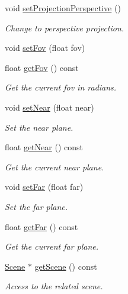 \begin{DoxyCompactItemize}
void \mbox{\hyperlink{classec_1_1_camera_af3544fbe030aadcd6bdfef8cb94e7b5c}{set\+Projection\+Perspective}} ()
\begin{DoxyCompactList}\small\item\em Change to perspective projection. \end{DoxyCompactList}\item 
void \mbox{\hyperlink{classec_1_1_camera_a1003feebe7df69a508f684c1c67f1388}{set\+Fov}} (float fov)
\item 
float \mbox{\hyperlink{classec_1_1_camera_a741cb88974dfd00492315ccf613e8539}{get\+Fov}} () const
\begin{DoxyCompactList}\small\item\em Get the current fov in radians. \end{DoxyCompactList}\item 
void \mbox{\hyperlink{classec_1_1_camera_af0c1f82f4cb2aeb3908b858093080556}{set\+Near}} (float near)
\begin{DoxyCompactList}\small\item\em Set the near plane. \end{DoxyCompactList}\item 
float \mbox{\hyperlink{classec_1_1_camera_a02786d8adecb275e6182cf166b65edb4}{get\+Near}} () const
\begin{DoxyCompactList}\small\item\em Get the current near plane. \end{DoxyCompactList}\item 
void \mbox{\hyperlink{classec_1_1_camera_abdc800333490ec4f890559951340bd08}{set\+Far}} (float far)
\begin{DoxyCompactList}\small\item\em Set the far plane. \end{DoxyCompactList}\item 
float \mbox{\hyperlink{classec_1_1_camera_a6555d47e1c17caf67cf8683b4cbaca4b}{get\+Far}} () const
\begin{DoxyCompactList}\small\item\em Get the current far plane. \end{DoxyCompactList}\item 
\mbox{\hyperlink{classec_1_1_scene}{Scene}} $\ast$ \mbox{\hyperlink{classec_1_1_camera_a33ad8a16eff39b34db86c6dbf2bbabe4}{get\+Scene}} () const
\begin{DoxyCompactList}\small\item\em Access to the related scene. \end{DoxyCompactList}\item 

\end{DoxyCompactItemize}
